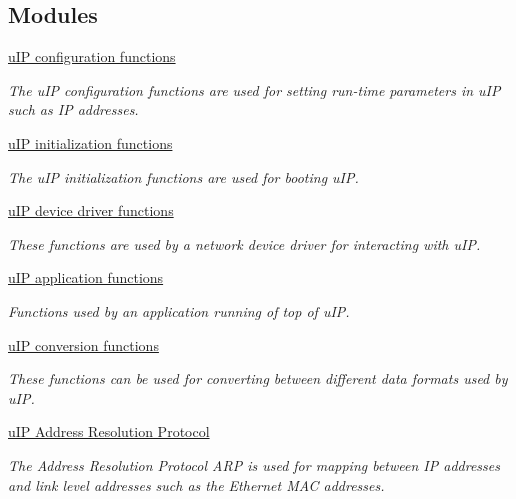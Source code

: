 \subsection*{Modules}
\begin{CompactItemize}
\item 
\hyperlink{a00061}{u\-IP configuration functions}
\begin{CompactList}\small\item\em The u\-IP configuration functions are used for setting run-time parameters in u\-IP such as IP addresses. \item\end{CompactList}

\item 
\hyperlink{a00062}{u\-IP initialization functions}
\begin{CompactList}\small\item\em The u\-IP initialization functions are used for booting u\-IP. \item\end{CompactList}

\item 
\hyperlink{a00063}{u\-IP device driver functions}
\begin{CompactList}\small\item\em These functions are used by a network device driver for interacting with u\-IP. \item\end{CompactList}

\item 
\hyperlink{a00064}{u\-IP application functions}
\begin{CompactList}\small\item\em Functions used by an application running of top of u\-IP. \item\end{CompactList}

\item 
\hyperlink{a00065}{u\-IP conversion functions}
\begin{CompactList}\small\item\em These functions can be used for converting between different data formats used by u\-IP. \item\end{CompactList}

\item 
\hyperlink{a00067}{u\-IP Address Resolution Protocol}
\begin{CompactList}\small\item\em The Address Resolution Protocol ARP is used for mapping between IP addresses and link level addresses such as the Ethernet MAC addresses. \item\end{CompactList}


\end{CompactItemize}
